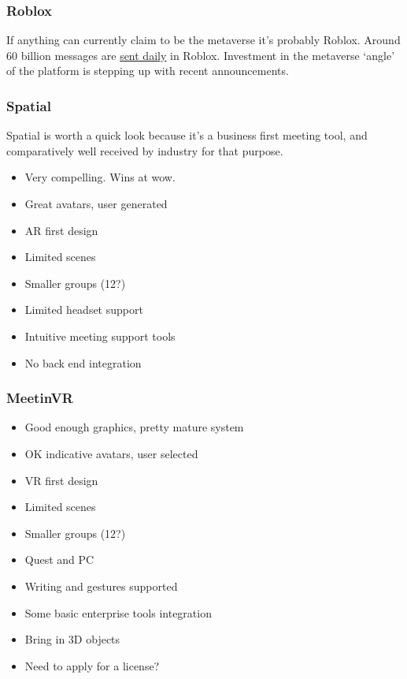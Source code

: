 \subsubsection{Roblox}
If anything can currently claim to be the metaverse it's probably Roblox. Around 60 billion messages are \href{https://podcasts.apple.com/us/podcast/developments-investments-experiences-in-the-metaverse/id1593908027?i=1000540906629}{sent daily} in Roblox. Investment in the metaverse `angle' of the platform is stepping up with recent announcements. 
\subsubsection{Spatial}
Spatial is worth a quick look because it's a business first meeting tool, and comparatively well received by industry for that purpose.
\begin{itemize}
\item Very compelling. Wins at wow.
\item Great avatars, user generated
\item AR first design
\item Limited scenes
\item Smaller groups (12?)
\item Limited headset support
\item Intuitive meeting support tools
\item No back end integration
\end{itemize}
\subsubsection{MeetinVR}
\begin{itemize}
\item Good enough graphics, pretty mature system
\item OK indicative avatars, user selected
\item VR first design
\item Limited scenes
\item Smaller groups (12?)
\item Quest and PC
\item Writing and gestures supported
\item Some basic enterprise tools integration
\item Bring in 3D objects
\item Need to apply for a license?
\end{itemize}
